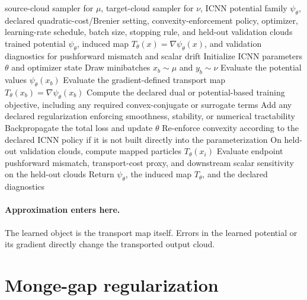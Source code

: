 \begin{algorithm}[ht]
\caption{\texttt{train\_icnn\_brenier\_map}}
\begin{algorithmic}[1]
\Require source-cloud sampler for \(\mu\), target-cloud sampler for \(\nu\), ICNN potential family \(\psi_\theta\), declared quadratic-cost/Brenier setting, convexity-enforcement policy, optimizer, learning-rate schedule, batch size, stopping rule, and held-out validation clouds
\Ensure trained potential \(\psi_\theta\), induced map \(T_\theta(x)=\nabla\psi_\theta(x)\), and validation diagnostics for pushforward mismatch and scalar drift
\State Initialize ICNN parameters \(\theta\) and optimizer state
  \State Draw minibatches \(x_b\sim\mu\) and \(y_b\sim\nu\)
  \State Evaluate the potential values \(\psi_\theta(x_b)\)
  \State Evaluate the gradient-defined transport map \(T_\theta(x_b)=\nabla\psi_\theta(x_b)\)
  \State Compute the declared dual or potential-based training objective, including any required convex-conjugate or surrogate terms
  \State Add any declared regularization enforcing smoothness, stability, or numerical tractability
  \State Backpropagate the total loss and update \(\theta\)
  \State Re-enforce convexity according to the declared ICNN policy if it is not built directly into the parameterization
\EndWhile
\State On held-out validation clouds, compute mapped particles \(T_\theta(x_i)\)
\State Evaluate endpoint pushforward mismatch, transport-cost proxy, and downstream scalar sensitivity on the held-out clouds
\State Return \(\psi_\theta\), the induced map \(T_\theta\), and the declared diagnostics
\end{algorithmic}
\end{algorithm}

\paragraph{Approximation enters here.}
The learned object is the transport map itself.  Errors in the learned potential or
its gradient directly change the transported output cloud.

\section{Monge-gap regularization}
\label{sec:bf-neural-ot-direct-monge-gap}

